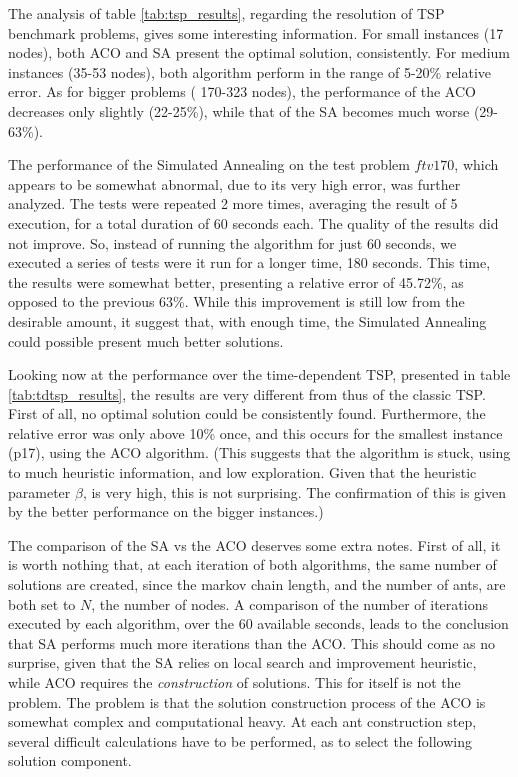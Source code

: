 The analysis of table \ref{tab:tsp_results}, regarding the resolution of TSP benchmark problems, gives some interesting information. For small instances (17 nodes), both ACO and SA present the optimal solution, consistently. For medium instances (35-53 nodes), both algorithm perform in the range of 5-20$\%$ relative error. As for bigger problems ( 170-323 nodes), the performance of the ACO decreases only slightly (22-25\%), while that of the SA becomes much worse (29-63\%). 

The performance of the Simulated Annealing on the test problem $ftv170$, which appears to be somewhat abnormal, due to its very high error, was further analyzed. The tests were repeated 2 more times, averaging the result of 5 execution, for a total duration of 60 seconds each. The quality of the results did not improve. So, instead of running the algorithm for just 60 seconds, we executed a series of tests were it run for a longer time, 180 seconds. This time, the results were somewhat better, presenting a relative error of 45.72\%, as opposed to the previous 63\%. While this improvement is still low from the desirable amount, it suggest that, with enough time, the Simulated Annealing could possible present much better solutions.

Looking now at the performance over the time-dependent TSP, presented in table \ref{tab:tdtsp_results}, the results are very different from thus of the classic TSP. First of all, no optimal solution could be consistently found. Furthermore, the relative error was only above 10\% once, and this occurs for the smallest instance (p17), using the ACO algorithm. (This suggests that the algorithm is stuck, using to much heuristic information, and low exploration. Given that the heuristic parameter $\beta$, is very high, this is not surprising. The confirmation of this is given by the better performance on the bigger instances.)

The comparison of the SA vs the ACO deserves some extra notes. First of all, it is worth nothing that, at each iteration of both algorithms, the same number of solutions are created, since the markov chain length, and the number of ants, are both set to $N$, the number of nodes. A comparison of the number of iterations executed by each algorithm, over the 60 available seconds, leads to the conclusion that SA performs much more iterations than the ACO. This should come as no surprise, given that the SA relies on local search and improvement heuristic, while ACO requires the \textit{construction} of solutions. This for itself is not the problem. The problem is that the solution construction process of the ACO is somewhat complex and computational heavy. At each ant construction step, several difficult calculations have to be performed, as to select the following solution component. 

